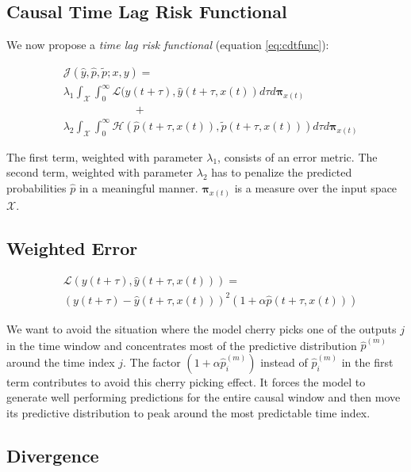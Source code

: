 \documentclass[envcountsect,runningheads]{llncs}
\theoremstyle{etoile}
\begin{document}
\subsection{Causal Time Lag Risk Functional}

We now propose a \emph{time lag risk functional} 
(equation \ref{eq:cdtfunc}):

\begin{align}\label{eq:cdtfunc}
&\mathcal{J}(\hat{y}, \hat{p}, \tilde{p}; x, y) = \\
&\nonumber \lambda_1 \int_{\mathcal{X}}{
      \int_{0}^{\infty}{
            \mathcal{L}(y(t + \tau), \hat{y}(t + \tau, x(t))
      }
}d\tau d\mathbf{\pi}_{x(t)} \\ 
& \nonumber \hspace{78pt}  + \\ 
&\nonumber  \lambda_2 \int_{\mathcal{X}}{\int_{0}^{\infty}
{\mathcal{H}\left(\hat{p}(t + \tau, x(t)), \tilde{p}(t + \tau, x(t))\right)}}d\tau d\mathbf{\pi}_{x(t)}
\end{align}

The first term, weighted with parameter $\lambda_1$, consists of an 
error metric. The second term, weighted with parameter $\lambda_2$ has to 
penalize the predicted probabilities $\hat{p}$ in a meaningful manner. 
$\mathbf{\pi}_{x(t)}$ is a measure over the input space $\mathcal{X}$.


\subsection{Weighted Error}


\begin{align}\label{eq:errorfunc}
&\mathcal{L}(y(t + \tau), \hat{y}(t + \tau, x(t))) = \\ 
\nonumber &\left (y(t + \tau) - \hat{y}(t + \tau, x(t)) \right)^2 
(1 + \alpha \hat{p}(t + \tau, x(t)))
\end{align}

We want to avoid the situation where the model cherry picks one of the outputs 
$j$ in the time window and concentrates most of the predictive 
distribution $\hat p^{(m)}$ around the time index $j$. The factor 
$(1 + \alpha \hat p_i^{(m)})$ instead of $\hat p_i^{(m)}$ in the first term 
contributes to avoid this cherry picking effect. It forces the model to 
generate well performing predictions for the entire causal window and then 
move its predictive distribution to peak around the most predictable time index.

\subsection{Divergence}
\end{document}
